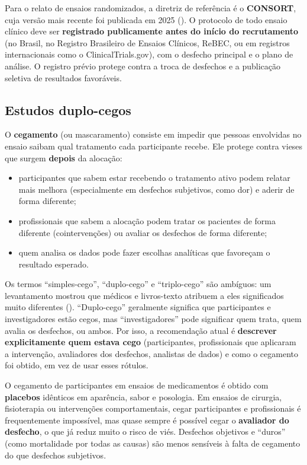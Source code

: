 \documentclass[
]{book}
\providecommand{\tightlist}{%
  \setlength{\itemsep}{0pt}\setlength{\parskip}{0pt}}
\begin{document}
Para o relato de ensaios randomizados, a diretriz de referência é o \textbf{CONSORT}, cuja versão mais recente foi publicada em 2025 (). O protocolo de todo ensaio clínico deve ser \textbf{registrado publicamente antes do início do recrutamento} (no Brasil, no Registro Brasileiro de Ensaios Clínicos, ReBEC, ou em registros internacionais como o ClinicalTrials.gov), com o desfecho principal e o plano de análise. O registro prévio protege contra a troca de desfechos e a publicação seletiva de resultados favoráveis.

\subsection{Estudos duplo-cegos}\label{estudos-duplo-cegos}

O \textbf{cegamento} (ou mascaramento) consiste em impedir que pessoas envolvidas no ensaio saibam qual tratamento cada participante recebe. Ele protege contra vieses que surgem \textbf{depois} da alocação:

\begin{itemize}
\tightlist
\item
  participantes que sabem estar recebendo o tratamento ativo podem relatar mais melhora (especialmente em desfechos subjetivos, como dor) e aderir de forma diferente;
\item
  profissionais que sabem a alocação podem tratar os pacientes de forma diferente (cointervenções) ou avaliar os desfechos de forma diferente;
\item
  quem analisa os dados pode fazer escolhas analíticas que favoreçam o resultado esperado.
\end{itemize}

Os termos ``simples-cego'', ``duplo-cego'' e ``triplo-cego'' são ambíguos: um levantamento mostrou que médicos e livros-texto atribuem a eles significados muito diferentes (). ``Duplo-cego'' geralmente significa que participantes e investigadores estão cegos, mas ``investigadores'' pode significar quem trata, quem avalia os desfechos, ou ambos. Por isso, a recomendação atual é \textbf{descrever explicitamente quem estava cego} (participantes, profissionais que aplicaram a intervenção, avaliadores dos desfechos, analistas de dados) e como o cegamento foi obtido, em vez de usar esses rótulos.

O cegamento de participantes em ensaios de medicamentos é obtido com \textbf{placebos} idênticos em aparência, sabor e posologia. Em ensaios de cirurgia, fisioterapia ou intervenções comportamentais, cegar participantes e profissionais é frequentemente impossível, mas quase sempre é possível cegar o \textbf{avaliador do desfecho}, o que já reduz muito o risco de viés. Desfechos objetivos e ``duros'' (como mortalidade por todas as causas) são menos sensíveis à falta de cegamento do que desfechos subjetivos.
\end{document}

